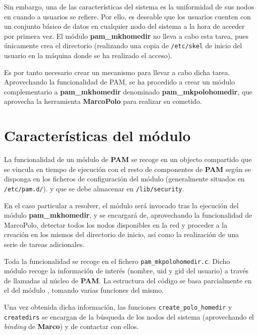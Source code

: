 \documentclass{article}
\begin{document}
Sin embargo, una de las características del sistema es la uniformidad de sus nodos en cuando a usuarios se refiere. Por ello, es deseable que los usuarios cuenten con un conjunto básico de datos en cualquier nodo del sistema a la hora de acceder por primera vez. El módulo \textbf{pam\_mkhomedir} no lleva a cabo esta tarea, pues únicamente crea el directorio (realizando una copia de \texttt{/etc/skel} de inicio del usuario en la máquina donde se ha realizado el acceso).

Es por tanto necesario crear un mecanismo para llevar a cabo dicha tarea. Aprovechando la funcionalidad de PAM, se ha procedido a crear un módulo complementario a \textbf{pam\_mkhomedir} denominado \textbf{pam\_mkpolohomedir}, que aprovecha la herramienta \textbf{MarcoPolo} para realizar su cometido.

\section{Características del módulo}

La funcionalidad de un módulo de \textbf{PAM} se recoge en un objecto compartido que se vincula en tiempo de ejecución con el resto de componentes de \textbf{PAM} según se disponga en los ficheros de configuración del módulo (generalmente situados en \texttt{/etc/pam.d/}). \cite{linux-pam-guide} y que se debe almacenar en \texttt{/lib/security}.  

En el caso particular a resolver, el módulo será invocado tras la ejecución del módulo \textbf{pam\_mkhomedir}, y se encargará de, aprovechando la funcionalidad de MarcoPolo, detectar todos los nodos disponibles en la red y proceder a la creación en los mismos del directorio de inicio, así como la realización de una serie de tareas adicionales.

Toda la funcionalidad se recoge en el fichero \texttt{pam\_mkpolohomedir.c}. Dicho módulo recoge la información de interés (nombre, uid y gid del usuario) a través de llamadas al núcleo de \textbf{PAM}\cite{linux-pam-guide-ch2}. La estructura del código se basa parcialmente en el del módulo \cite{pam_makehomedir_code}, tomando varias funciones del mismo.



Una vez obtenida dicha información, las funciones \texttt{create\_polo\_homedir} y \texttt{createdirs} se encargan de la búsqueda de los nodos del sistema (aprovechando el \textit{binding} de \textbf{Marco}) y de contactar con ellos.
\end{document}
